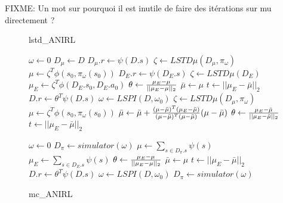 \documentclass{article}
\begin{document}
FIXME: Un mot sur pourquoi il est inutile de faire des itérations sur mu directement ?
\begin{figure*}
 \begin{minipage}[t]{.45\textwidth}
 \begin{algorithm}[H]
   \caption{lstd\_ANIRL} 
   \label{alg:lstd_anirl} 
   \begin{algorithmic}[1]
     \STATE $\omega \leftarrow 0$
     {\color{blue}
     \STATE $D_\mu \leftarrow D $
     \STATE $D_\mu.r \leftarrow \psi(D.s)$
     \STATE $\zeta \leftarrow LSTD\mu( D_\mu, \pi_\omega )$
     \STATE $\mu \leftarrow \zeta^T\phi(s_0,\pi_\omega(s_0))$
     \STATE $D_E.r \leftarrow \psi(D_E.s)$
     \STATE $\zeta \leftarrow LSTD\mu( D_E )$ 
     \STATE $\mu_E \leftarrow \zeta^T\phi(D_E.s_0, D_E.a_0)$
     }
     \STATE $\theta \leftarrow {\mu_E - \mu\over ||\mu_E - \mu||_2}$
     \STATE $ \bar\mu \leftarrow \mu $
     \STATE $ t \leftarrow ||\mu_E - \bar\mu||_2 $
     \STATE $D.r \leftarrow \theta^T\psi(D.s)$
     \STATE $ \omega \leftarrow LSPI( D, \omega_0 ) $
     {\color{blue}
     \STATE $ \zeta \leftarrow LSTD\mu( D_\mu, \pi_\omega )$   
     \STATE $ \mu \leftarrow \zeta^T\phi(s_0,\pi_\omega(s_0))$}
     \STATE $\bar\mu \leftarrow \bar\mu + { (\mu-\bar\mu)^T (\mu_E-\bar\mu) \over (\mu-\bar\mu)^T (\mu-\bar\mu) } (\mu-\bar\mu) $ 
     \STATE $\theta \leftarrow 
       {\mu_E - \bar\mu\over ||\mu_E - \bar\mu||_2}$
     \STATE $ t\leftarrow ||\mu_E - \bar\mu||_2$
     \ENDWHILE
   \end{algorithmic}
 \end{algorithm}
 \end{minipage}
 \hfill
 \begin{minipage}[t]{.45\textwidth}
   \begin{algorithm}[H]
   \caption{mc\_ANIRL} 
   \label{alg:mc_anirl} 
   \begin{algorithmic}[1]
     \STATE $\omega \leftarrow 0$
     {\color{blue}
     \STATE $D_\pi \leftarrow simulator( \omega )$
     \STATE $\mu \leftarrow \sum\limits_{s\in D_\pi.s}\psi(s)$
     \STATE $\mu_E \leftarrow \sum\limits_{s\in D_E.s}\psi(s)$
     }
     \STATE $\theta \leftarrow {\mu_E - \mu\over ||\mu_E - \mu||_2}$
     \STATE $ \bar\mu \leftarrow \mu $
     \STATE $ t \leftarrow ||\mu_E - \bar\mu||_2 $
     \STATE $D.r \leftarrow \theta^T\psi(D.s)$  
     \STATE $ \omega \leftarrow LSPI( D, \omega_0 ) $  
     {\color{blue}
     \STATE $D_\pi \leftarrow simulator( \omega )$
}
\end{algorithmic}
\end{algorithm}
\end{minipage}
\end{figure*}
\end{document}
